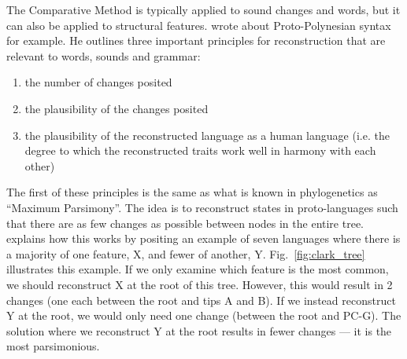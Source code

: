 \documentclass[a4paper,10pt]{article} %
\begin{document}


The Comparative Method is typically applied to sound changes and words, but it can also be applied to structural features. \citet[17-22]{clark1976aspects} wrote about Proto-Polynesian syntax for example. He outlines three important principles for reconstruction that are relevant to words, sounds and grammar:

\begin{enumerate}[label=(\roman*)]
\item the number of changes posited
\item the plausibility of the changes posited
\item the plausibility of the reconstructed language as a human language (i.e. the degree to which the reconstructed traits work well in harmony with each other)
\end{enumerate}

The first of these principles is the same as what is known in phylogenetics as ``Maximum Parsimony''. The idea is to reconstruct states in proto-languages such that there are as few changes as possible between nodes in the entire tree. \citet[17-22]{clark1976aspects} explains how this works by positing an example of seven languages where there is a majority of one feature, X, and fewer of another, Y. Fig.~\ref{fig:clark_tree} illustrates this example. If we only examine which feature is the most common, we should reconstruct X at the root of this tree. However, this would result in 2 changes (one each between the root and tips A and B). If we instead reconstruct Y at the root, we would only need one change (between the root and PC-G). The solution where we reconstruct Y at the root results in fewer changes --- it is the most parsimonious.
 
\end{document}
